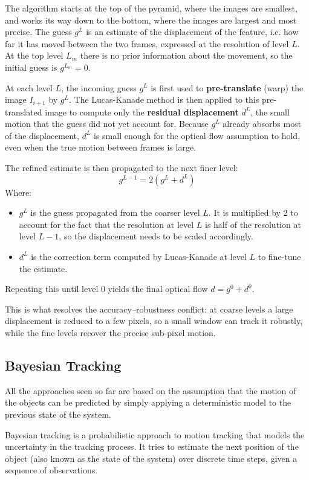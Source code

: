 The algorithm starts at the top of the pyramid, where the images are smallest, and works its way down to the bottom, where the images are largest and most precise.
The guess $g^L$ is an estimate of the displacement of the feature, i.e. how far it has moved between the two frames, expressed at the resolution of level $L$.
At the top level $L_m$ there is no prior information about the movement, so the initial guess is $g^{L_m} = 0$.

At each level $L$, the incoming guess $g^L$ is first used to \textbf{pre-translate} (warp) the image $I_{i+1}$ by $g^L$.
The Lucas-Kanade method is then applied to this pre-translated image to compute only the \textbf{residual displacement} $d^L$,
the small motion that the guess did not yet account for.
Because $g^L$ already absorbs most of the displacement, $d^L$ is small enough for the optical flow assumption to hold, even when the true motion between frames is large.

The refined estimate is then propagated to the next finer level:
$$g^{L-1} = 2(g^L + d^{L})$$
Where:
\begin{itemize}
    \item $g^L$ is the guess propagated from the coarser level $L$. It is multiplied by 2 to account for the fact that the resolution at level $L$ is half of the resolution at level $L-1$,
    so the displacement needs to be scaled accordingly.
    \item $d^{L}$ is the correction term computed by Lucas-Kanade at level $L$ to fine-tune the estimate.
\end{itemize}
Repeating this until level $0$ yields the final optical flow $d = g^0 + d^0$.

This is what resolves the accuracy--robustness conflict: at coarse levels a large displacement is reduced to a few pixels,
so a small window can track it robustly, while the fine levels recover the precise sub-pixel motion.

\subsection{Bayesian Tracking}
All the approaches seen so far are based on the assumption that the motion of the objects can be predicted by simply applying a deterministic model to the previous state of the system.

Bayesian tracking is a probabilistic approach to motion tracking that models the uncertainty in the tracking process. 
It tries to estimate the next position of the object (also known as the state of the system) over discrete time steps, 
given a sequence of observations.

